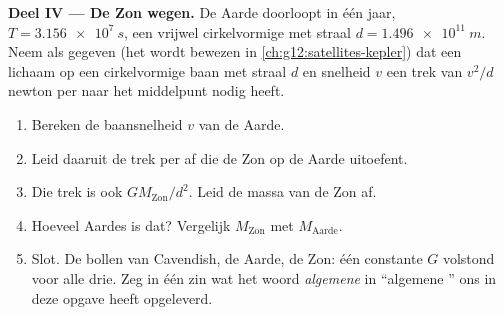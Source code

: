 \begin{problem}
\medskip
\noindent\textbf{Deel IV --- De Zon wegen.}
De Aarde doorloopt in één jaar, $T = \qty{3.156e7}{s}$, een vrijwel
cirkelvormige  met straal $d = \qty{1.496e11}{m}$. Neem als gegeven
(het wordt bewezen in \cref{ch:g12:satellites-kepler}) dat een lichaam op
een cirkelvormige baan met straal $d$ en snelheid $v$ een trek van
$v^2/d$ newton per  naar het middelpunt nodig heeft.
\begin{enumerate}[resume]
  \item Bereken de baansnelheid $v$ van de Aarde.
  \item Leid daaruit de trek per  af die de Zon op de Aarde
        uitoefent.
  \item Die trek is ook $G M_{\text{Zon}} / d^2$. Leid de massa van de
        Zon af.
  \item Hoeveel Aardes is dat? Vergelijk $M_{\text{Zon}}$ met
        $M_{\text{Aarde}}$.
  \item Slot. De bollen van Cavendish, de Aarde, de Zon: één constante
        $G$ volstond voor alle drie. Zeg in één zin wat het woord
        \emph{algemene} in ``algemene '' ons in deze opgave
        heeft opgeleverd.
\end{enumerate}
\end{problem}
